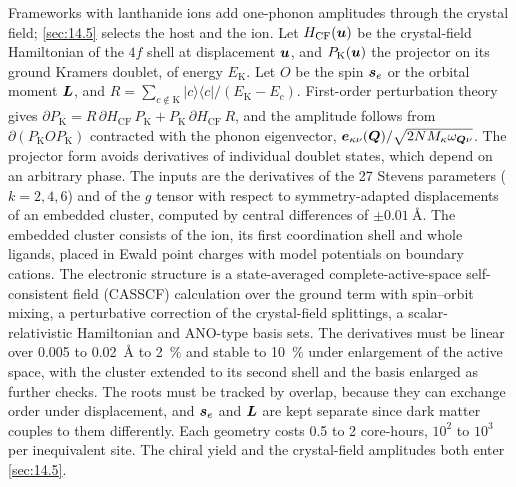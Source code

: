 Frameworks with lanthanide ions add one-phonon amplitudes through the crystal field; \cref{sec:14.5} selects the host and the ion. Let $H_{\mathrm{CF}}(\bm{u})$ be the crystal-field Hamiltonian of the $4f$ shell at displacement $\bm{u}$, and $P_{\mathrm{K}}(\bm{u})$ the projector on its ground Kramers doublet, of energy $E_{\mathrm{K}}$. Let $O$ be the spin $\bm{s}_e$ or the orbital moment $\bm{L}$, and $R = \sum_{c\notin\mathrm{K}}|c\rangle\langle c|/(E_{\mathrm{K}} - E_c)$. First-order perturbation theory gives $\partial P_{\mathrm{K}} = R\,\partial H_{\mathrm{CF}}\,P_{\mathrm{K}} + P_{\mathrm{K}}\,\partial H_{\mathrm{CF}}\,R$, and the amplitude follows from $\partial(P_{\mathrm{K}}OP_{\mathrm{K}})$ contracted with the phonon eigenvector, $\bm{e}_{\kappa\nu}(\bm{Q})/\sqrt{2NM_\kappa\omega_{\bm{Q}\nu}}$. The projector form avoids derivatives of individual doublet states, which depend on an arbitrary phase. The inputs are the derivatives of the 27 Stevens parameters ($k = 2,4,6$) and of the $g$ tensor with respect to symmetry-adapted displacements of an embedded cluster, computed by central differences of $\pm\SI{0.01}{\angstrom}$. The embedded cluster consists of the ion, its first coordination shell and whole ligands, placed in Ewald point charges with model potentials on boundary cations. The electronic structure is a state-averaged complete-active-space self-consistent field (CASSCF) calculation over the ground term with spin--orbit mixing, a perturbative correction of the crystal-field splittings, a scalar-relativistic Hamiltonian and ANO-type basis sets. The derivatives must be linear over 0.005 to \SI{0.02}{\angstrom} to \SI{2}{\percent} and stable to \SI{10}{\percent} under enlargement of the active space, with the cluster extended to its second shell and the basis enlarged as further checks. The roots must be tracked by overlap, because they can exchange order under displacement, and $\bm{s}_e$ and $\bm{L}$ are kept separate since dark matter couples to them differently. Each geometry costs 0.5 to 2 core-hours, $10^2$ to $10^3$ per inequivalent site. The chiral yield and the crystal-field amplitudes both enter \cref{sec:14.5}.
